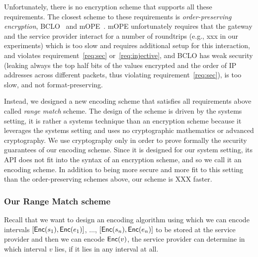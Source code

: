  
 

Unfortunately, there is no encryption scheme that supports all these requirements. The closest scheme to these requirements  is {\em order-preserving encryption}, BCLO~\cite{boldyreva:ope} and mOPE~\cite{popa:mope}. mOPE unfortunately requires that the gateway and the service provider interact for a number of roundtrips (e.g., xxx in our experiments) which is too slow and requires additional setup for this interaction, and violates requirement~\ref{req:sec} or~\ref{req:injective}, and BCLO has weak security (leaking always the top half bits of the values encrypted and the order of IP addresses across different packets, thus violating requirement~\ref{req:sec}), is too slow, and not format-preserving. 

Instead, we designed a new encoding scheme that satisfies all requirements above called {\em range match} scheme. 
The design of the scheme is driven by the systems setting, it is rather a systems technique than an encryption scheme because it leverages the systems setting and uses no cryptographic mathematics or advanced cryptography.  We use cryptography only in order to prove formally the security guarantees of our encoding scheme. Since it is designed for our system setting, its API does not fit into the syntax of an encryption scheme, and so we call it an encoding scheme. 
In addition to being more secure and more fit to this setting than the order-preserving schemes above, our scheme is XXX faster.



\subsubsection{Our Range Match scheme} 


Recall that we want to design an encoding algorithm using which we can encode intervals  $[\mathsf{Enc}(s_1), \mathsf{Enc}(e_1)]$, $\dots$, $[\mathsf{Enc}(s_n), \mathsf{Enc}(e_n)]$ to be stored at the service provider and then we can encode  $\mathsf{Enc}(v)$, the service provider can determine in which interval $v$ lies, if it lies in any interval at all. 

